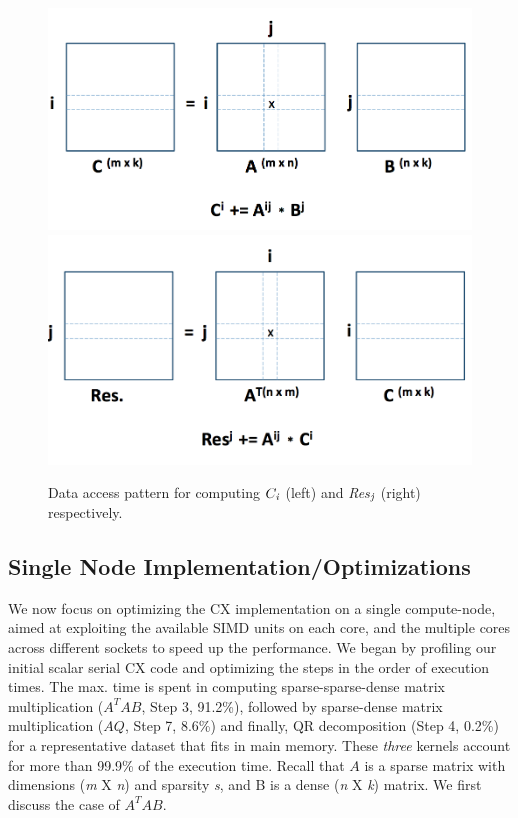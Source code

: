      \begin{figure}[htp]
         \includegraphics[scale=0.254]{images/jatin_a}
         \includegraphics[scale=0.254]{images/jatin_b}
         \caption{ Data access pattern for computing ${C}_{\it{i}}$ (left) and {\it{Res}}$_{\it{j}}$ (right) respectively.}
         \label{fig:access_pattern}
           \end{figure}

\subsection {Single Node Implementation/Optimizations}
\label{sxn:single_node_opt}

    We now focus on optimizing the CX implementation on a single
    compute-node, aimed at exploiting the available SIMD units on each
    core, and the multiple cores across different sockets to speed up the performance. 
    We began by profiling our initial %
    scalar serial CX
    code and optimizing the steps in the order of execution times.
    The max. time is spent in computing sparse-sparse-dense matrix
    multiplication ($A^TAB$, Step 3, 91.2\%), followed by  sparse-dense matrix
    multiplication ($AQ$, Step 7, 8.6\%) and finally, QR
    decomposition (Step 4, 0.2\%)
    for a representative dataset that fits in main memory. These
    {\it{three}} kernels account for more than 99.9\% of
    the execution time.
    Recall that $A$ is a sparse matrix with dimensions ({\it{m}} X
    {\it{n}}) and sparsity {\it{s}}, and B is a dense ({\it{n}} X {\it{k}}) matrix.
    We first discuss the case of $A^TAB$.


